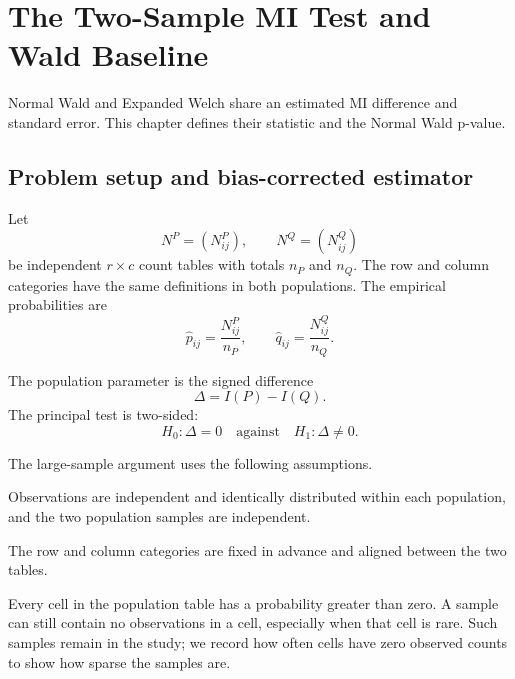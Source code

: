\chapter{The Two-Sample MI Test and Wald Baseline}
\label{chap:baselines}

Normal Wald and Expanded Welch share an estimated MI difference and standard
error. This chapter defines their statistic and the Normal Wald p-value.

\section{Problem setup and bias-corrected estimator}

Let
\begin{equation}
  N^P=(N^P_{ij}),
  \qquad
  N^Q=(N^Q_{ij})
\end{equation}
be independent \(r\times c\) count tables with totals \(n_P\) and \(n_Q\).
The row and column categories have the same definitions in both populations.
The empirical probabilities are
\begin{equation}
  \widehat p_{ij}=\frac{N^P_{ij}}{n_P},
  \qquad
  \widehat q_{ij}=\frac{N^Q_{ij}}{n_Q}.
\end{equation}

The population parameter is the signed difference
\begin{equation}
  \Delta=I(P)-I(Q).
  \label{eq:delta-population}
\end{equation}
The principal test is two-sided:
\begin{equation}
  H_0:\Delta=0
  \quad\text{against}\quad
  H_1:\Delta\ne0.
  \label{eq:two-sample-null}
\end{equation}

The large-sample argument uses the following assumptions.

\begin{samepage}
\begin{assumption}[Sampling]
Observations are independent and identically distributed within each
population, and the two population samples are independent.
\end{assumption}
\end{samepage}

\begin{assumption}
The row and column categories are fixed in advance and aligned between the two
tables.
\end{assumption}

\begin{assumption}
Every cell in the population table has a probability greater than zero. A
sample can still contain no observations in a cell, especially when that cell
is rare. Such samples remain in the study; we record how often cells have
zero observed counts to show how sparse the samples are.
\end{assumption}

